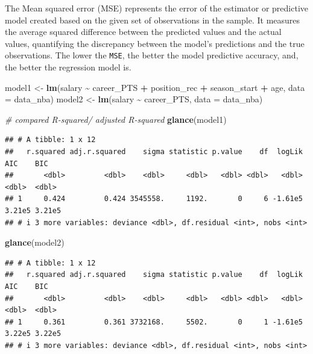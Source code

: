 \documentclass[
]{book}
\newenvironment{Shaded}{\begin{snugshade}}{\end{snugshade}}
\newcommand{\AttributeTok}[1]{\textcolor[rgb]{0.13,0.29,0.53}{#1}}
\newcommand{\CommentTok}[1]{\textcolor[rgb]{0.56,0.35,0.01}{\textit{#1}}}
\newcommand{\FunctionTok}[1]{\textcolor[rgb]{0.13,0.29,0.53}{\textbf{#1}}}
\newcommand{\NormalTok}[1]{#1}
\newcommand{\OtherTok}[1]{\textcolor[rgb]{0.56,0.35,0.01}{#1}}
\newcommand{\SpecialCharTok}[1]{\textcolor[rgb]{0.81,0.36,0.00}{\textbf{#1}}}
\begin{document}
The Mean squared error (MSE) represents the error of the estimator or predictive model created based on the given set of observations in the sample. It measures the average squared difference between the predicted values and the actual values, quantifying the discrepancy between the model's predictions and the true observations. The lower the \texttt{MSE}, the better the model predictive accuracy, and, the better the regression model is.

\begin{Shaded}
\begin{Highlighting}[]
\NormalTok{model1 }\OtherTok{\textless{}{-}} \FunctionTok{lm}\NormalTok{(salary }\SpecialCharTok{\textasciitilde{}}\NormalTok{ career\_PTS }\SpecialCharTok{+}\NormalTok{ position\_rec }\SpecialCharTok{+}\NormalTok{ season\_start }\SpecialCharTok{+}
\NormalTok{             age, }\AttributeTok{data =}\NormalTok{ data\_nba)}
\NormalTok{model2 }\OtherTok{\textless{}{-}} \FunctionTok{lm}\NormalTok{(salary }\SpecialCharTok{\textasciitilde{}}\NormalTok{ career\_PTS, }\AttributeTok{data =}\NormalTok{ data\_nba)}

\CommentTok{\# compared R{-}squared/ adjusted R{-}squared}
\FunctionTok{glance}\NormalTok{(model1)}
\end{Highlighting}
\end{Shaded}

\begin{verbatim}
## # A tibble: 1 x 12
##   r.squared adj.r.squared    sigma statistic p.value    df  logLik    AIC    BIC
##       <dbl>         <dbl>    <dbl>     <dbl>   <dbl> <dbl>   <dbl>  <dbl>  <dbl>
## 1     0.424         0.424 3545558.     1192.       0     6 -1.61e5 3.21e5 3.21e5
## # i 3 more variables: deviance <dbl>, df.residual <int>, nobs <int>
\end{verbatim}

\begin{Shaded}
\begin{Highlighting}[]
\FunctionTok{glance}\NormalTok{(model2)}
\end{Highlighting}
\end{Shaded}

\begin{verbatim}
## # A tibble: 1 x 12
##   r.squared adj.r.squared    sigma statistic p.value    df  logLik    AIC    BIC
##       <dbl>         <dbl>    <dbl>     <dbl>   <dbl> <dbl>   <dbl>  <dbl>  <dbl>
## 1     0.361         0.361 3732168.     5502.       0     1 -1.61e5 3.22e5 3.22e5
## # i 3 more variables: deviance <dbl>, df.residual <int>, nobs <int>
\end{verbatim}
\end{document}
